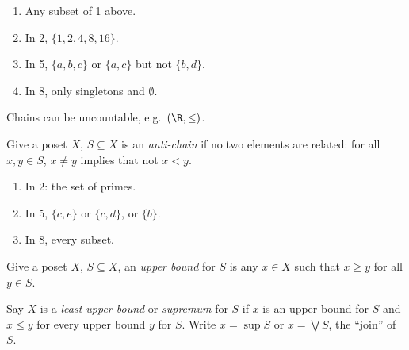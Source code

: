 \documentclass[a4paper]{article}
\begin{document}
\begin{eg}\leavevmode
  \begin{enumerate}
  \item Any subset of 1 above.
  \item In 2, \(\{1, 2, 4, 8, 16\}\).
  \item In 5, \(\{a, b, c\}\) or \(\{a, c\}\) but not \(\{b, d\}\).
  \item In 8, only singletons and \(\emptyset\).
  \end{enumerate}
\end{eg}

\begin{note}
  Chains can be uncountable, e.g.\ \((\R, \leq)\).
\end{note}

\begin{definition}
  Give a poset \(X\), \(S \subseteq X\) is an \emph{anti-chain} if no two elements are related: for all \(x, y \in S\), \(x \neq y\) implies that not \(x < y\).
\end{definition}

\begin{eg}\leavevmode
  \begin{enumerate}
  \item In 2: the set of primes.
  \item In 5, \(\{c, e\}\) or \(\{c, d\}\), or \(\{b\}\).
  \item In 8, every subset.
  \end{enumerate}
\end{eg}

\begin{definition}
  Give a poset \(X\), \(S \subseteq X\), an \emph{upper bound} for \(S\) is any \(x \in X\) such that \(x \geq y\) for all \(y \in S\).
\end{definition}

\begin{definition}
  Say \(X\) is a \emph{least upper bound} or \emph{supremum} for \(S\) if \(x\) is an upper bound for \(S\) and \(x \leq y\) for every upper bound \(y\) for \(S\). Write \(x = \sup S\) or \(x = \bigvee S\), the ``join'' of \(S\).
\end{definition}
\end{document}

